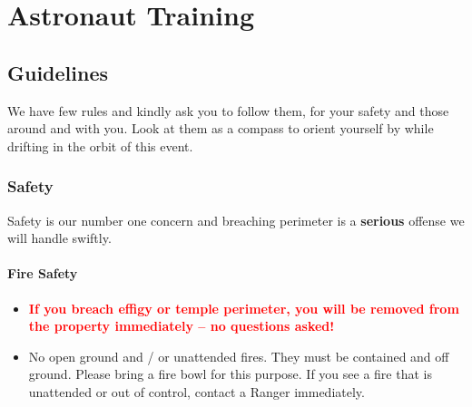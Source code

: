 %


\chapter{Astronaut Training}

\ifisflight
\putchapterthumb
\fi

\section*{Guidelines}
We have few rules and kindly ask you to follow them, for your safety and those around and with you.  Look at them as a compass to orient yourself by while drifting in the orbit of this event. 

\subsection*{Safety}
Safety is our number one concern and breaching perimeter is a \textbf{serious} offense we will handle swiftly. 

\subsubsection*{Fire Safety}
\begin{itemize}[noitemsep]
\item \textbf{\textcolor{red}{If you breach effigy or temple perimeter, you will be removed from the property immediately -- no questions asked!}} 
\item No open ground and / or unattended fires. They must be contained and off ground. Please bring a fire bowl for this purpose. If you see a fire that is unattended or out of control, contact a Ranger immediately.
\end{itemize}

